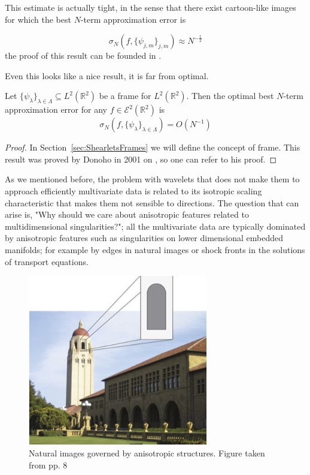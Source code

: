 This estimate is actually tight, in the sense that there exist cartoon-like images for which the best $N$-term approximation error is

$$
\sigma_N(f,\{\psi_{j,m}\}_{j,m})\approx N^{-\frac{1}{2}}
$$
the proof of this result can be founded in \cite{Mallat}.

Even this looks like a nice result, it is far from optimal.

\bigskip

\begin{thm}
\label{C3S2T1}
Let $\{\psi_{\lambda}\}_{\lambda\in\Lambda}\subseteq L^2(\mathbb{R}^2)$ be a frame for $L^2(\mathbb{R}^2)$. Then the optimal best $N$-term approximation error for any $f\in\mathcal{E}^2(\mathbb{R}^2)$ is
$$
\sigma_N(f,\{\psi_{\lambda}\}_{\lambda\in\Lambda})=O(N^{-1})
$$
\end{thm}
\begin{proof}
In Section~\ref{sec:ShearletsFrames} we will define the concept of frame. This result was proved by Donoho in 2001 on \cite{DonohobestNterm}, so one can refer to his proof.
\end{proof}

\bigskip

As we mentioned before, the problem with wavelets that does not make them to approach efficiently multivariate data is related to its isotropic scaling characteristic that makes them not sensible to directions. The question that can arise is, "Why should we care about anisotropic features related to multidimensional singularities?"; all the multivariate data are typically dominated by anisotropic features such as singularities on lower dimensional embedded manifolds; for example by edges in natural images or shock fronts in the solutions of transport equations. 

\begin{figure}[h!]
\centering
\includegraphics[width = 0.7\textwidth]{./Diagrams/edges-images.jpg}
\caption{Natural images governed by anisotropic structures. Figure taken from \cite{IntroShearlets} pp. 8}
\label{edges-images}
\end{figure}

